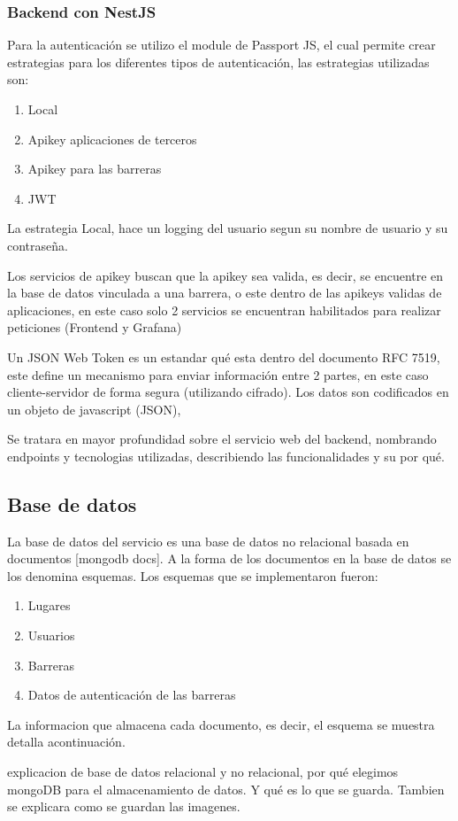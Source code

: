 \subsubsection*{Backend con NestJS}


Para la autenticación se utilizo el module de Passport JS, el cual permite crear estrategias para los diferentes tipos de autenticación, las estrategias utilizadas son:

\begin{enumerate}
        \item Local
        \item Apikey aplicaciones de terceros
        \item Apikey para las barreras
        \item JWT
\end{enumerate}

La estrategia Local, hace un logging del usuario segun su nombre de usuario y su contraseña.

Los servicios de apikey buscan que la apikey sea valida, es decir, se encuentre en la base de datos vinculada a una barrera, o este dentro de las apikeys validas de aplicaciones, en este caso solo 2 servicios se encuentran habilitados para realizar peticiones (Frontend y Grafana)

Un JSON Web Token es un estandar qué esta dentro del documento RFC 7519, este define un mecanismo para enviar información entre 2 partes, en este caso cliente-servidor de forma segura (utilizando cifrado). Los datos son codificados en un objeto de javascript (JSON),

Se tratara en mayor profundidad sobre el servicio web del backend, nombrando endpoints y tecnologias utilizadas, describiendo las funcionalidades y su por qué.


\subsection{Base de datos}

La base de datos del servicio es una base de datos no relacional basada en documentos [mongodb docs]. A la forma de los documentos en la base de datos se los denomina esquemas. Los esquemas que se implementaron fueron:

\begin{enumerate}
        \item Lugares
        \item Usuarios
        \item Barreras
        \item Datos de autenticación de las barreras
\end{enumerate}

La informacion que almacena cada documento, es decir, el esquema se muestra detalla acontinuación.



explicacion de base de datos relacional y no relacional, por qué elegimos mongoDB para el almacenamiento de datos. Y qué es lo que se guarda. Tambien se explicara como se guardan las imagenes. \\
